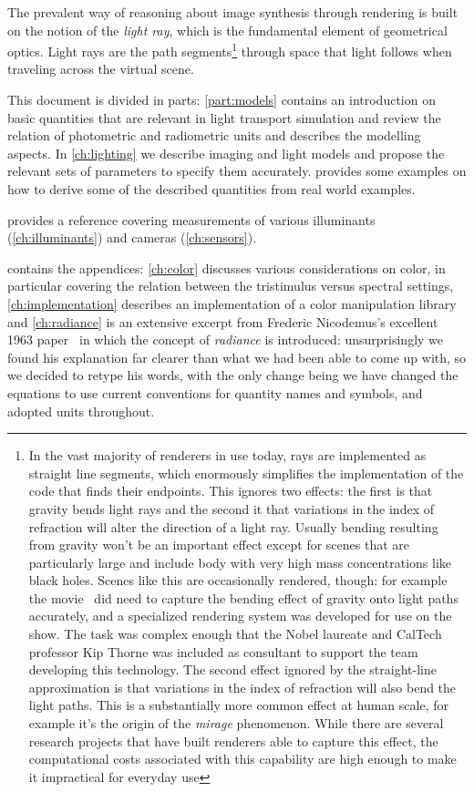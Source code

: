 The prevalent way of reasoning about image synthesis through rendering is 
built on the notion of the \textsl{light ray}, which is the fundamental element 
of geometrical optics. 
Light rays are the path segments\footnote{
	In the vast majority of renderers in use today, rays are implemented as 
	straight line segments, which enormously simplifies the implementation of the
	code that finds their endpoints. This ignores two effects: the first is that 
	gravity bends light rays and the second it that variations in the index
	of refraction will alter the direction of a light ray.
	Usually bending resulting from gravity won't be an important effect except 
	for scenes that are particularly large and include body with very high mass 
	concentrations like black holes.
	Scenes like this are occasionally rendered, though: for example the 
	movie~\cite{interstellar2014} did need to capture the bending effect of 
	gravity onto light paths accurately, and a specialized rendering system 
	was developed for use on the show. 
	The task was complex enough that the Nobel laureate and CalTech professor 
	Kip Thorne was included as consultant to support the team developing this 
	technology. 
	The second effect ignored by the straight-line approximation is that 
	variations in the index of refraction will also bend the light paths. 
	This is a substantially more common effect at human scale, for example 
	it's the origin of the \textsl{mirage} phenomenon. 
	While there are several research projects that have built renderers able 
	to capture this effect, the computational costs associated with this capability 
	are high enough to make it impractical for everyday use
} through space that light follows when traveling across the \gls{virtual scene}. 

This document is divided in parts: \cref{part:models}
contains an introduction on basic quantities that are relevant in
light transport simulation and review the relation of photometric and
radiometric units and describes the modelling aspects. In 
\cref{ch:lighting} we describe imaging and light models and propose the
relevant sets of parameters to specify them accurately.  
 provides some examples on how to derive some of
the described quantities from real world examples.

 provides a reference covering measurements of various 
illuminants (\cref{ch:illuminants}) and cameras (\cref{ch:sensors}).

 contains the appendices: \cref{ch:color} discusses
various considerations on color, in particular covering the relation between 
the tristimulus versus spectral settings,
\cref{ch:implementation} describes an implementation of a color manipulation library
and \cref{ch:radiance} is an extensive excerpt from Frederic Nicodemus's 
excellent 1963 paper~\cite{nicodemus63} in which the concept of \textsl{\gls{radiance}}
is introduced: unsurprisingly we found his explanation far clearer than what we 
had been able to come up with, so we decided to retype his words, with the only change being
we have changed the equations to use current conventions for quantity names and symbols, 
and adopted  units throughout.

